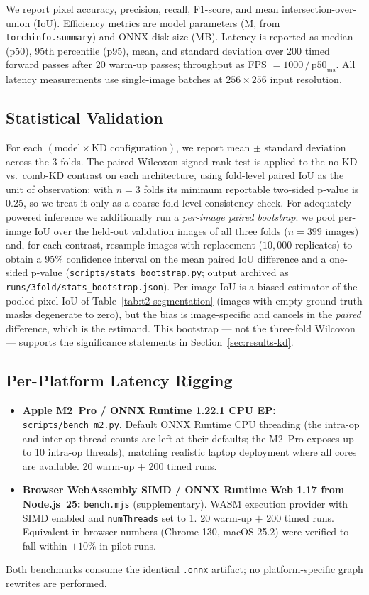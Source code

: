 We report pixel accuracy, precision, recall, F1-score, and mean intersection-over-union (IoU). Efficiency metrics are model parameters (M, from \texttt{torchinfo.summary}) and ONNX disk size (MB). Latency is reported as median (p50), 95th percentile (p95), mean, and standard deviation over 200 timed forward passes after 20 warm-up passes; throughput as FPS $= 1000\,/\,\text{p50}_{\text{ms}}$. All latency measurements use single-image batches at $256{\times}256$ input resolution.

\subsection{Statistical Validation}
\label{sec:setup-stats}

For each $(\text{model} \times \text{KD configuration})$, we report mean $\pm$ standard deviation across the 3 folds. The paired Wilcoxon signed-rank test is applied to the no-KD vs.~comb-KD contrast on each architecture, using fold-level paired IoU as the unit of observation; with $n=3$ folds its minimum reportable two-sided p-value is 0.25, so we treat it only as a coarse fold-level consistency check. For adequately-powered inference we additionally run a \emph{per-image paired bootstrap}: we pool per-image IoU over the held-out validation images of all three folds ($n=399$ images) and, for each contrast, resample images with replacement ($10{,}000$ replicates) to obtain a 95\% confidence interval on the mean paired IoU difference and a one-sided p-value (\texttt{scripts/stats\_bootstrap.py}; output archived as \texttt{runs/3fold/stats\_bootstrap.json}). Per-image IoU is a biased estimator of the pooled-pixel IoU of Table~\ref{tab:t2-segmentation} (images with empty ground-truth masks degenerate to zero), but the bias is image-specific and cancels in the \emph{paired} difference, which is the estimand. This bootstrap --- not the three-fold Wilcoxon --- supports the significance statements in Section~\ref{sec:results-kd}.

\subsection{Per-Platform Latency Rigging}
\label{sec:setup-latency}

\begin{itemize}
\item \textbf{Apple M2~Pro / ONNX Runtime 1.22.1 CPU EP:} \texttt{scripts/bench\_m2.py}. Default ONNX Runtime CPU threading (the intra-op and inter-op thread counts are left at their defaults; the M2~Pro exposes up to 10 intra-op threads), matching realistic laptop deployment where all cores are available. 20 warm-up $+$ 200 timed runs.
\item \textbf{Browser WebAssembly SIMD / ONNX Runtime Web 1.17 from Node.js~25:} \texttt{bench.mjs} (supplementary). WASM execution provider with SIMD enabled and \texttt{numThreads} set to 1. 20 warm-up $+$ 200 timed runs. Equivalent in-browser numbers (Chrome 130, macOS 25.2) were verified to fall within $\pm 10\%$ in pilot runs.
\end{itemize}

Both benchmarks consume the identical \texttt{.onnx} artifact; no platform-specific graph rewrites are performed.
